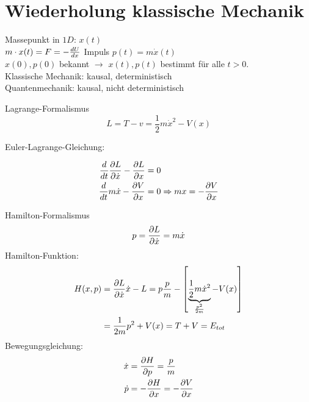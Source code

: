 \section{Wiederholung klassische Mechanik} %
\label{sec:Wiederholung_klassische_Mechanik}
Massepunkt in $1D$: $x(t)$ \\
$m \cdot x(t) = F = -\frac{dU}{dx}$ \quad Impuls $p(t) = m \dot{x}(t)$ \\
$x(0) , p(0)$ bekannt $\longrightarrow$ $x(t), p(t)$ bestimmt für alle $t >0$. \\
Klassische Mechanik: kausal, deterministisch \\
Quantenmechanik: kausal, nicht deterministisch
\begin{erl}{Lagrange-Formalismus}
    \begin{equation*}
        L=T-v= \frac{1}{2} m \dot{x}^2 - V(x)
    \end{equation*}    

    Euler-Lagrange-Gleichung:

    \begin{align*}
        \frac{d}{dt} \frac{\partial L}{\partial \dot{x}} - \frac{\partial L}{\partial x} &= 0 \\
        \frac{d}{dt} m \dot{x} - \frac{\partial V}{\partial x} &= 0 \Rightarrow mx = - \frac{\partial V}{\partial x}
    \end{align*}
\end{erl}
\begin{erl}{Hamilton-Formalismus}
    \begin{equation*}
        p = \frac{\partial L}{\partial\dot{x}} = m \dot{x}
    \end{equation*}
    Hamilton-Funktion:
    \begin{align*}
        H(x,p)
        &=
        \frac{\partial L}{\partial \dot{x}} \dot{x} - L = p \frac{p}{m} - 
            \left[ \underbrace{\frac{1}{2} m \dot{x}^2}_{\frac{p^2}{2m}} - V(x)
            \right] \\
        &=
        \frac{1}{2m} p^2 + V(x) = T + V = E_{tot}
    \end{align*}
    Bewegungsgleichung:
    \begin{align*}
        \dot{x} &= \frac{\partial H}{\partial p} = \frac{p}{m} \\
        \dot{p} &= - \frac{\partial H}{\partial x} = - \frac{\partial
        V}{\partial x}
    \end{align*}
\end{erl}

